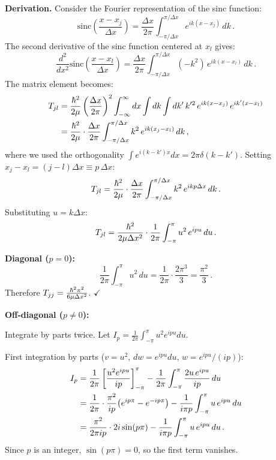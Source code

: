 \textbf{Derivation.} Consider the Fourier representation of the sinc function:
\begin{equation}
  \text{sinc}\!\left(\frac{x - x_j}{\Delta x}\right) = \frac{\Delta x}{2\pi}\int_{-\pi/\Delta x}^{\pi/\Delta x}e^{ik(x-x_j)}\,dk\,.
\end{equation}
The second derivative of the sinc function centered at $x_l$ gives:
\begin{equation}
  \frac{d^2}{dx^2}\text{sinc}\!\left(\frac{x-x_l}{\Delta x}\right)
  = \frac{\Delta x}{2\pi}\int_{-\pi/\Delta x}^{\pi/\Delta x}(-k^2)\,e^{ik(x-x_l)}\,dk\,.
\end{equation}
The matrix element becomes:
\begin{align}
  T_{jl} &= \frac{\hbar^2}{2\mu}\left(\frac{\Delta x}{2\pi}\right)^2
  \int_{-\infty}^{\infty}dx\int dk\int dk'\,k'^2\,e^{ik(x-x_j)}\,e^{ik'(x-x_l)}\notag\\
  &= \frac{\hbar^2}{2\mu}\cdot\frac{\Delta x}{2\pi}\int_{-\pi/\Delta x}^{\pi/\Delta x}k^2\,e^{ik(x_j-x_l)}\,dk\,,
\end{align}
where we used the orthogonality $\int e^{i(k-k')x}dx = 2\pi\delta(k-k')$.
Setting $x_j - x_l = (j-l)\Delta x \equiv p\,\Delta x$:
\begin{equation}
  T_{jl} = \frac{\hbar^2}{2\mu}\cdot\frac{\Delta x}{2\pi}\int_{-\pi/\Delta x}^{\pi/\Delta x}k^2\,e^{ikp\Delta x}\,dk\,.
\end{equation}
Substituting $u = k\Delta x$:
\begin{equation}\label{eq:T_integral}
  T_{jl} = \frac{\hbar^2}{2\mu\Delta x^2}\cdot\frac{1}{2\pi}\int_{-\pi}^{\pi}u^2\,e^{ipu}\,du\,.
\end{equation}

\textbf{Diagonal ($p = 0$):}
\begin{equation}
  \frac{1}{2\pi}\int_{-\pi}^{\pi}u^2\,du = \frac{1}{2\pi}\cdot\frac{2\pi^3}{3} = \frac{\pi^2}{3}\,.
\end{equation}
Therefore $T_{jj} = \frac{\hbar^2\pi^2}{6\mu\Delta x^2}$. $\checkmark$

\textbf{Off-diagonal ($p \neq 0$):}

Integrate by parts twice. Let $I_p = \frac{1}{2\pi}\int_{-\pi}^{\pi}u^2 e^{ipu}du$.

First integration by parts ($v = u^2$, $dw = e^{ipu}du$, $w = e^{ipu}/(ip)$):
\begin{align}
  I_p &= \frac{1}{2\pi}\left[\frac{u^2 e^{ipu}}{ip}\right]_{-\pi}^{\pi}
       - \frac{1}{2\pi}\int_{-\pi}^{\pi}\frac{2u\,e^{ipu}}{ip}\,du\notag\\
  &= \frac{1}{2\pi}\cdot\frac{\pi^2}{ip}\bigl(e^{ip\pi}-e^{-ip\pi}\bigr)
     - \frac{1}{i\pi p}\int_{-\pi}^{\pi}u\,e^{ipu}\,du\notag\\
  &= \frac{\pi^2}{2\pi ip}\cdot 2i\sin(p\pi)
     - \frac{1}{i\pi p}\int_{-\pi}^{\pi}u\,e^{ipu}\,du\,.
\end{align}
Since $p$ is an integer, $\sin(p\pi) = 0$, so the first term vanishes.

